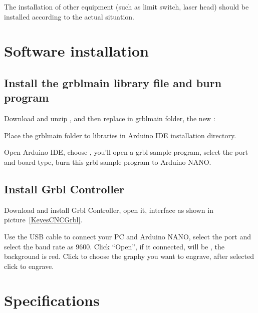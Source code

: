 The installation of other equipment (such as limit switch, laser head) should be installed according to the actual situation.

\section{Software installation}


\subsection{Install the grblmain library file and burn program}

Download and unzip , and then replace  in grblmain folder, the new : 

Place the grblmain folder to libraries in Arduino IDE installation directory.

Open Arduino IDE, choose , you’ll open a grbl sample program, select the port and board type, burn this grbl sample program to Arduino NANO.

\subsection{Install Grbl Controller}

Download and install Grbl Controller, open it, interface as shown in picture~\ref{KeyesCNCGrbl}.

\begin{center}
	
	\label{KeyesCNCGrbl}
\end{center}



Use the USB cable to connect your PC and Arduino NANO, select the port and select the baud rate as 9600. Click “Open”, if it connected,  will be , the background is red. Click  to choose the graphy you want to engrave, after selected click  to engrave.

\section{Specifications}

